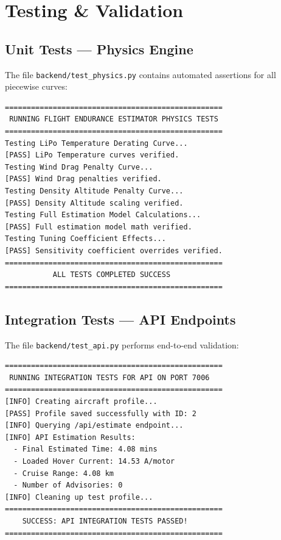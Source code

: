\documentclass[11pt,a4paper]{article}
\begin{document}
\newpage

\section{Testing \& Validation}

\subsection{Unit Tests --- Physics Engine}
The file \texttt{backend/test\_physics.py} contains automated assertions for all piecewise curves:

\begin{lstlisting}[caption={Physics test execution output}]
==================================================
 RUNNING FLIGHT ENDURANCE ESTIMATOR PHYSICS TESTS
==================================================
Testing LiPo Temperature Derating Curve...
[PASS] LiPo Temperature curves verified.
Testing Wind Drag Penalty Curve...
[PASS] Wind Drag penalties verified.
Testing Density Altitude Penalty Curve...
[PASS] Density Altitude scaling verified.
Testing Full Estimation Model Calculations...
[PASS] Full estimation model math verified.
Testing Tuning Coefficient Effects...
[PASS] Sensitivity coefficient overrides verified.
==================================================
           ALL TESTS COMPLETED SUCCESS
==================================================
\end{lstlisting}

\subsection{Integration Tests --- API Endpoints}
The file \texttt{backend/test\_api.py} performs end-to-end validation:

\begin{lstlisting}[caption={API integration test execution output}]
==================================================
 RUNNING INTEGRATION TESTS FOR API ON PORT 7006
==================================================
[INFO] Creating aircraft profile...
[PASS] Profile saved successfully with ID: 2
[INFO] Querying /api/estimate endpoint...
[INFO] API Estimation Results:
  - Final Estimated Time: 4.08 mins
  - Loaded Hover Current: 14.53 A/motor
  - Cruise Range: 4.08 km
  - Number of Advisories: 0
[INFO] Cleaning up test profile...
==================================================
    SUCCESS: API INTEGRATION TESTS PASSED!
==================================================
\end{lstlisting}
\end{document}
